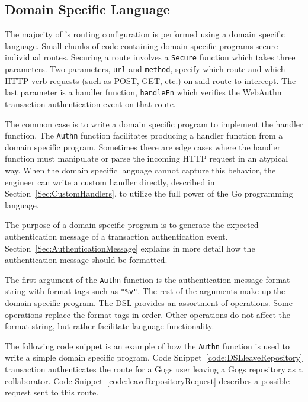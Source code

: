 

\subsection{Domain Specific Language}\label{Sec:DomainSpecificLanguage}

The majority of \sys{}'s routing configuration is performed using a domain specific language. Small chunks of code containing domain specific programs secure individual routes. Securing a route involves a \lstinline{Secure} function which takes three parameters. Two parameters, \lstinline{url} and \lstinline{method}, specify which route and which HTTP verb requests (such as POST, GET, etc.) on said route to intercept. The last parameter is a handler function, \lstinline{handleFn} which verifies the WebAuthn transaction authentication event on that route. 

The common case is to write a domain specific program to implement the handler function. The \lstinline{Authn} function facilitates producing a handler function from a domain specific program. Sometimes there are edge cases where the handler function must manipulate or parse the incoming HTTP request in an atypical way. When the domain specific language cannot capture this behavior, the engineer can write a custom handler directly, described in Section~\ref{Sec:CustomHandlers}, to utilize the full power of the Go programming language.

The purpose of a domain specific program is to generate the expected authentication message of a transaction authentication event. Section~\ref{Sec:AuthenticationMessage} explains in more detail how the authentication message should be formatted. 

The first argument of the \lstinline{Authn} function is the authentication message format string with format tags such as \lstinline{"%v"}. The rest of the arguments make up the domain specific program. The DSL provides an assortment of operations. Some operations replace the format tags in order. Other operations do not affect the format string, but rather facilitate language functionality.

The following code snippet is an example of how the \lstinline{Authn} function is used to write a simple domain specific program. Code Snippet~\ref{code:DSLleaveRepository} transaction authenticates the route for a Gogs user leaving a Gogs repository as a collaborator. Code Snippet~\ref{code:leaveRepositoryRequest} describes a possible request sent to this route.

